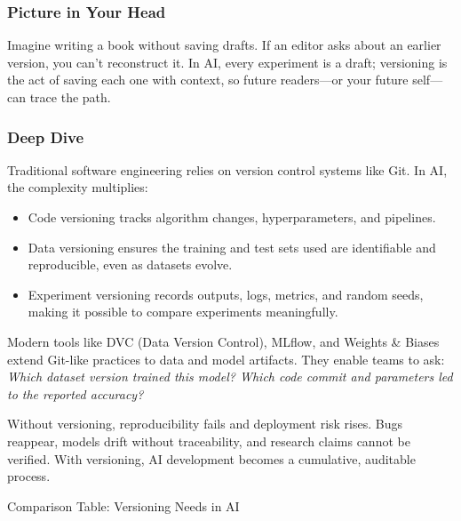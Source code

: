 \documentclass[
  letterpaper,
  DIV=11,
  numbers=noendperiod]{scrreprt}
\providecommand{\tightlist}{%
  \setlength{\itemsep}{0pt}\setlength{\parskip}{0pt}}
\begin{document}
\subsubsection{Picture in Your Head}\label{picture-in-your-head-91}

Imagine writing a book without saving drafts. If an editor asks about an
earlier version, you can't reconstruct it. In AI, every experiment is a
draft; versioning is the act of saving each one with context, so future
readers---or your future self---can trace the path.

\subsubsection{Deep Dive}\label{deep-dive-91}

Traditional software engineering relies on version control systems like
Git. In AI, the complexity multiplies:

\begin{itemize}
\tightlist
\item
  Code versioning tracks algorithm changes, hyperparameters, and
  pipelines.
\item
  Data versioning ensures the training and test sets used are
  identifiable and reproducible, even as datasets evolve.
\item
  Experiment versioning records outputs, logs, metrics, and random
  seeds, making it possible to compare experiments meaningfully.
\end{itemize}

Modern tools like DVC (Data Version Control), MLflow, and Weights \&
Biases extend Git-like practices to data and model artifacts. They
enable teams to ask: \emph{Which dataset version trained this model?
Which code commit and parameters led to the reported accuracy?}

Without versioning, reproducibility fails and deployment risk rises.
Bugs reappear, models drift without traceability, and research claims
cannot be verified. With versioning, AI development becomes a
cumulative, auditable process.

Comparison Table: Versioning Needs in AI
\end{document}
